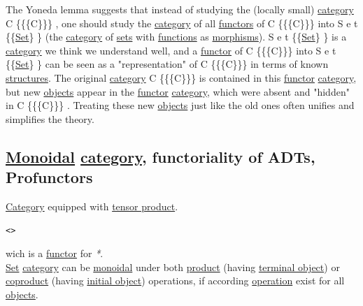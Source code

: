 \documentclass[11pt]{article}
\begin{document}
The Yoneda lemma suggests that instead of studying the (locally small) \hyperref[org3e3a79b]{category} C \{\displaystyle \{\mathcal \{C\}\}\}  , one should study the \hyperref[org3e3a79b]{category} of all \hyperref[org6c3c2a6]{functors} of C \{\displaystyle \{\mathcal \{C\}\}\}  into S e t \{\displaystyle \mathbf \{\hyperref[orgbed80ba]{Set}\} \}  (the \hyperref[org3e3a79b]{category} of \hyperref[org4e7443a]{sets} with \hyperref[org66c5288]{functions} as \hyperref[org8ed0ce8]{morphisms}). S e t \{\displaystyle \mathbf \{\hyperref[orgbed80ba]{Set}\} \}  is a \hyperref[org3e3a79b]{category} we think we understand well, and a \hyperref[org6073683]{functor} of C \{\displaystyle \{\mathcal \{C\}\}\}  into S e t \{\displaystyle \mathbf \{\hyperref[orgbed80ba]{Set}\} \}  can be seen as a "representation" of C \{\displaystyle \{\mathcal \{C\}\}\}  in terms of known \hyperref[org51d1eff]{structures}. The original \hyperref[org3e3a79b]{category} C \{\displaystyle \{\mathcal \{C\}\}\}  is contained in this \hyperref[org6073683]{functor} \hyperref[org3e3a79b]{category}, but new \hyperref[orge0f000f]{objects} appear in the \hyperref[org6073683]{functor} \hyperref[org3e3a79b]{category}, which were absent and "hidden" in C \{\displaystyle \{\mathcal \{C\}\}\}  . Treating these new \hyperref[orge0f000f]{objects} just like the old ones often unifies and simplifies the theory.\\

\subsection{\hyperref[org71af906]{Monoidal} \hyperref[org3e3a79b]{category}, functoriality of ADTs, Profunctors}
\label{sec:orgc152389}

\hyperref[org3e3a79b]{Category} equipped with \hyperref[orgdb0e4bc]{tensor product}.\\
\begin{verbatim}
<>
\end{verbatim}
wich is a \hyperref[org6073683]{functor} for \emph{*}.\\

\hyperref[orgbed80ba]{Set} \hyperref[org3e3a79b]{category} can be \hyperref[org71af906]{monoidal} under both \hyperref[orga3d1454]{product} (having \hyperref[org05f2dea]{terminal object}) or \hyperref[orge655d87]{coproduct} (having \hyperref[org7d94b27]{initial object}) operations, if according \hyperref[org87d485b]{operation} exist for all \hyperref[orge0f000f]{objects}.\\
\end{document}
